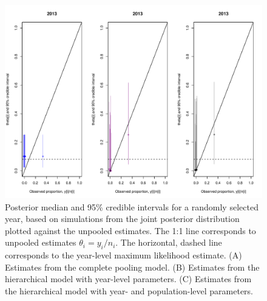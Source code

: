 \documentclass[12pt, oneside, titlepage]{article}   	%
\begin{document}
\begin{figure}[h]
   \centering
       \includegraphics[page=1,width=.9\textwidth]{../../figures/appendix-x-figure54-2}  
    \caption{ Posterior median and 95\% credible intervals for a randomly selected year, based on simulations from the joint posterior distribution plotted against the unpooled estimates. The 1:1 line corresponds to unpooled estimates $\theta_i = y_i/n_i$. The horizontal, dashed line corresponds to the year-level maximum likelihood estimate. (A) Estimates from the complete pooling model. (B) Estimates from the hierarchical model with year-level parameters. (C) Estimates from the hierarchical model with year- and population-level parameters. } 
 \label{fig:hierarchical_shrinking1}
\end{figure}
\end{document}

